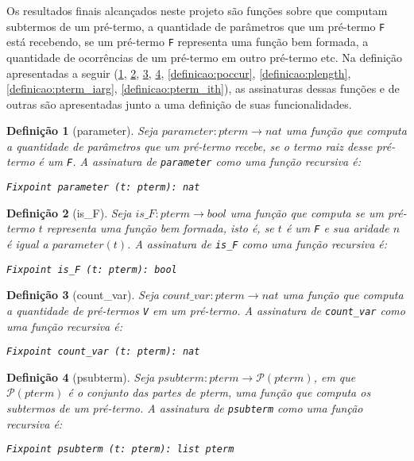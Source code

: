 \documentclass{article}
\newtheorem{definicao}{Definição}
\begin{document}
Os resultados finais alcançados neste projeto são funções sobre que computam subtermos de um pré-termo, a quantidade de parâmetros que um pré-termo \texttt{F} está recebendo, se um pré-termo \texttt{F} representa uma função bem formada, a quantidade de ocorrências de um pré-termo em outro pré-termo etc.  Na definição apresentadas a seguir (\ref{definicao:parameter}, \ref{definicao:is_F}, \ref{definicao:count_var}, \ref{definicao:psubterm}, \ref{definicao:poccur}, \ref{definicao:plength}, \ref{definicao:pterm_iarg}, \ref{definicao:pterm_ith}), as assinaturas dessas funções e de outras são apresentadas junto a uma definição de suas funcionalidades.

\begin{definicao}[parameter]
	Seja $parameter: pterm \rightarrow nat$ uma função que computa a quantidade de parâmetros que um pré-termo recebe, se o termo raiz desse pré-termo é um \texttt{F}. A assinatura de \texttt{parameter} como uma função recursiva é:

	\texttt{Fixpoint parameter (t: pterm): nat}
	\label{definicao:parameter}
\end{definicao}

\begin{definicao}[is\_F]
	Seja $is\_F: pterm \rightarrow bool$ uma função que computa se um pré-termo $t$ representa uma função bem formada, isto é, se $t$ é um \texttt{F} e sua aridade $n$ é igual a $parameter(t)$. A assinatura de \texttt{is\_F} como uma função recursiva é:

	\texttt{Fixpoint is\_F (t: pterm): bool}
	\label{definicao:is_F}
\end{definicao}

\begin{definicao}[count\_var]
	Seja $count\_var: pterm \rightarrow nat$ uma função que computa a quantidade de pré-termos \texttt{V} em um pré-termo. A assinatura de \texttt{count\_var} como uma função recursiva é:

	\texttt{Fixpoint count\_var (t: pterm): nat}
	\label{definicao:count_var}
\end{definicao}

\begin{definicao}[psubterm]
	Seja $psubterm: pterm \rightarrow \mathcal{P}(pterm)$, em que $\mathcal{P}(pterm)$ é o conjunto das partes de pterm, uma função que computa os subtermos de um pré-termo. A assinatura de \texttt{psubterm} como uma função recursiva é:

	\texttt{Fixpoint psubterm (t: pterm): list pterm}
	\label{definicao:psubterm}
\end{definicao}
\end{document}
